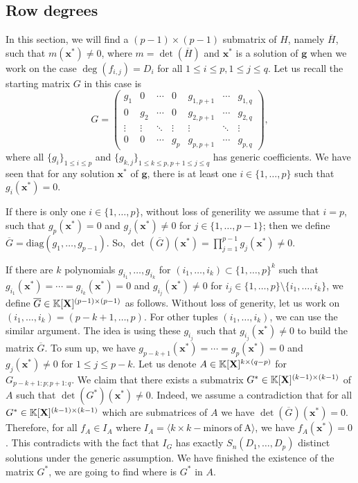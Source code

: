 \documentclass[11pt]{article}
\numberwithin{Property}{section}
\numberwithin{Theorem}{section}
\numberwithin{Proposition}{section}
\numberwithin{Lemma}{section}
\numberwithin{Corollary}{section}
\numberwithin{Definition}{section}
\numberwithin{Remark}{section}
\numberwithin{Conjecture}{section}
\numberwithin{Problem}{section}
\numberwithin{Claim}{section}
\theoremstyle{definition}
\numberwithin{Example}{section}
\def\g {\ensuremath{\mathbf{g}}}
\renewcommand{\leq}{\leqslant}
\def\bar{\overline}
\newcommand{\field}{\mathbb{K}} %
\newcommand{\mat}[1]{\mathbf{\MakeUppercase{#1}}} %
\begin{document}
\subsection{Row degrees}
\label{subsec:row2}
In this section, we will find a $(p-1)\times (p-1)$ submatrix of $H$, namely $\bar{H}$, such that $m(\mathbf{x}^*) \ne 0$, where $m = \det(\bar{H})$ and $\mathbf{x}^*$ is a solution of $\g$ when we work on the case $\deg(f_{i,j}) = D_i$ for all $1 \leq i \leq p, 1\leq j \leq q$. Let us recall the starting matrix $G$ in this case is 
\[ G = \left( \begin{matrix}
g_1 & 0 & \cdots & 0 & g_{1,p+1} & \cdots & g_{1, q}\\
0 & g_2 & \cdots & 0 & g_{2,p+1} & \cdots & g_{2, q}\\
\vdots & \vdots & \ddots & \vdots & \vdots & \ddots & \vdots\\
0 & 0 & \cdots & g_p & g_{p,p+1} & \cdots & g_{p, q}
\end{matrix} \right), \] where all $\{g_i\}_{1 \leq i \leq p}$ and $\{g_{k,j}\}_{1 \leq k \leq p, p+1\leq j \leq q}$ has generic coefficients. We have seen that for any solution $\mathbf{x}^{*}$ of $\g$, there is at least one $i \in \{1, \ldots , p\}$ such that $g_i(\mathbf{x}^*) = 0$. 

If there is only one $i \in \{1, \ldots, p\}$, without loss of generility we assume that $i=p$, such that $g_{p}(\mathbf{x}^*) = 0$ and $g_{j}(\mathbf{x}^*) \ne 0$ for $j \in \{1, \ldots, p-1\}$; then we define $\bar{G} = \mathrm{diag}(g_1, \ldots, g_{p-1})$. So, $\det(\bar{G})(\mathbf{x}^*) = \prod_{j=1}^{p-1}g_j(\mathbf{x}^*) \ne 0$.

If there are $k$ polynomials $g_{i_1}, \ldots, g_{i_k}$ for $(i_1, \ldots, i_k) \subset \{1, \ldots, p\}^k$ such that $g_{i_1}(\mathbf{x}^*) = \cdots = g_{i_k}(\mathbf{x}^*) = 0$ and $g_{i_j}(\mathbf{x}^*) \ne 0$ for $i_j \in \{1, \ldots, p\} \setminus \{i_1, \ldots, i_k\}$, we define $\bar{G} \in \field[\mat{X}]^{(p-1) \times (p-1)}$ as follows. Without loss of generity, let us work on $(i_1, \ldots, i_k) = (p-k+1, \ldots, p)$. For other tuples $(i_1, \ldots, i_k)$, we can use the similar argument. The idea is using these $g_{i_j}$ such that $g_{i_j}(\mathbf{x}^*) \ne 0$ to build the matrix $\bar{G}$. To sum up, we have $g_{p-k+1}(\mathbf{x}^*) = \cdots = g_{p}(\mathbf{x}^*) = 0$ and $g_j(\mathbf{x}^*) \ne 0$ for $1 \leq j \leq p-k$. Let us denote $A \in \field[\mat{X}]^{k \times (q-p)}$ for $G_{p-k+1:p\mathbf{;}p+1:q}$. We claim that there exists a submatrix ${G}^* \in \field[\mat{X}]^{(k-1) \times (k-1)}$ of $A$ such that $\det({G}^*)(\mathbf{x}^*) \ne 0$. Indeed, we assume a contradiction that for all ${G}^* \in \field[\mat{X}]^{(k-1) \times (k-1)}$ which are submatrices of $A$ we have $\det(\bar{G})(\mathbf{x}^*) = 0$. Therefore, for all $f_{A} \in I_A$ where $I_A = \langle k \times k - \mathrm{minors \ of \ A}\rangle$, we have $f_A(\mathbf{x}^*) = 0$. This contradicts with the fact that $I_G$ has exactly $S_n(D_1, \ldots, D_p)$ distinct solutions under the generic assumption. We have finished the existence of the matrix ${G}^*$, we are going to find where is ${G}^*$ in $A$. 
\end{document}
